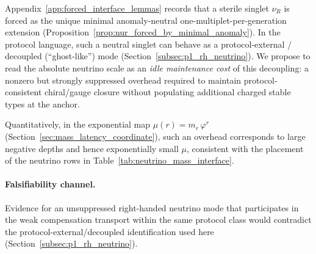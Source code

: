 \InterfaceTag Appendix~\ref{app:forced_interface_lemmas} records that a sterile singlet $\nu_R$ is forced as the unique minimal anomaly-neutral one-multiplet-per-generation extension (Proposition~\ref{prop:nur_forced_by_minimal_anomaly}).
In the protocol language, such a neutral singlet can behave as a protocol-external / decoupled (``ghost-like'') mode (Section~\ref{subsec:p1_rh_neutrino}).
We propose to read the absolute neutrino scale as an \emph{idle maintenance cost} of this decoupling: a nonzero but strongly suppressed overhead required to maintain protocol-consistent chiral/gauge closure without populating additional charged stable types at the anchor.

\InterfaceTag Quantitatively, in the exponential map $\mu(r)=m_e\,\varphi^{r}$ (Section~\ref{sec:mass_latency_coordinate}), such an overhead corresponds to large negative depths and hence exponentially small $\mu$, consistent with the placement of the neutrino rows in Table~\ref{tab:neutrino_mass_interface}.

\paragraph{Falsifiability channel.}
Evidence for an unsuppressed right-handed neutrino mode that participates in the weak compensation transport within the same protocol class would contradict the protocol-external/decoupled identification used here (Section~\ref{subsec:p1_rh_neutrino}).
